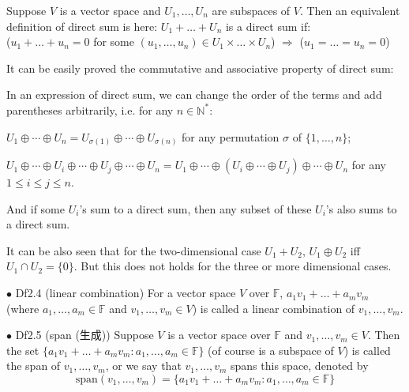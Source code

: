 \documentclass{article}
\begin{document}
\begin{Rmk}{}
    \begin{compactenum}
        \item Suppose $V$ is a vector space and $U_1, \dots, U_n$ are subspaces of $V$. Then an equivalent definition of direct sum is here: \textcolor{Th}{$U_1+\dots+U_n$ is a direct sum if: \\
        ($u_1+\dots + u_n = 0$ for some $(u_1, \dots, u_n)\in U_1\times\dots\times U_n$) $\Rightarrow$ ($u_1 = \dots = u_n = 0$)}
        \item It can be easily proved the commutative and associative property of direct sum: \textcolor{Th}{In an expression of direct sum, we can change the order of the terms and add parentheses arbitrarily, i.e. for any $n\in\mathbb{N}^\ast$:
        \begin{compactenum}
            \item $U_1\oplus\cdots\oplus U_n = U_{\sigma(1)}\oplus\cdots\oplus U_{\sigma(n)}$ for any permutation $\sigma$ of $\{1, \dots, n\}$;
            \item $U_1\oplus\cdots\oplus U_i\oplus\cdots\oplus U_j\oplus \cdots\oplus U_n = U_1\oplus\cdots\oplus \left(U_i\oplus\cdots\oplus U_j\right)\oplus\cdots\oplus U_n$ for any $1\leq i\leq j\leq n$.
        \end{compactenum}}
        And \textcolor{Th}{if some $U_i$'s sum to a direct sum, then any subset of these $U_i$'s also sums to a direct sum.}
        \item It can be also seen that \textcolor{Th}{for the two-dimensional case $U_1+U_2$, $U_1\oplus U_2$ iff $U_1\cap U_2 = \{0\}$. But this does not holds for the three or more dimensional cases.}
    \end{compactenum}
\end{Rmk}

\begin{Df}{$\bullet$ Df2.4 (linear combination)}
    For a vector space $V$ over $\mathbb{F}$, $a_1v_1+\dots+a_mv_m$ (where $a_1,\dots, a_m\in \mathbb{F}$ and $v_1,\dots, v_m\in V$) is called a linear combination of $v_1, \dots, v_m$.
\end{Df}

\begin{Df}{$\bullet$ Df2.5 (span (生成))}
    Suppose $V$ is a vector space over $\mathbb{F}$ and $v_1, \dots, v_m\in V$. Then the set $\{a_1v_1+\dots+a_mv_m: a_1,\dots,a_m\in\mathbb{F}\}$ (of course is a subspace of $V$) is called the span of $v_1, \dots, v_m$, or we say that $v_1, \dots, v_m$ spans this space, denoted by 
    $$\text{span} (v_1, \dots, v_m) = \{a_1v_1+\dots+a_mv_m: a_1,\dots,a_m\in\mathbb{F}\}$$
\end{Df}
\end{document}

